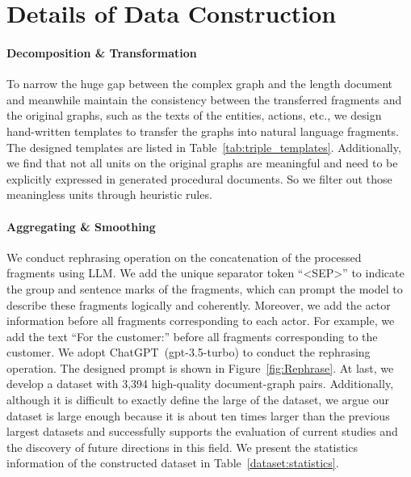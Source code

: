 \appendix


\section{Details of Data Construction
}

\label{app:DataConstruction}
%


\paragraph{Decomposition \& Transformation}

\label{app:DT}
To narrow the huge gap between the complex graph and the length document and meanwhile maintain the consistency between the transferred fragments and the original graphs, such as the texts of the entities, actions, etc., we design hand-written templates to transfer the graphs into natural language fragments. The designed templates are listed in Table~\ref{tab:triple_templates}.
Additionally, we find that not all units on the original graphs are meaningful and need to be explicitly expressed in generated procedural documents. So we filter out those meaningless units through heuristic rules.

\paragraph{Aggregating \& Smoothing}

\label{app:Aggregating_Smoothing}
%
We conduct rephrasing operation on the concatenation of the processed fragments using LLM. We add the unique separator token ``<SEP>'' to indicate the group and sentence marks of the fragments, which can prompt the model to describe these fragments logically and coherently.
Moreover, we add the actor information before all fragments corresponding to each actor. For example, we add the text ``For the customer:'' before all fragments corresponding to the customer.
We adopt ChatGPT~(gpt-3.5-turbo) to conduct the rephrasing operation. The designed prompt is shown in Figure~\ref{fig:Rephrase}.
At last, we develop a dataset with 3,394 high-quality document-graph pairs.
Additionally, although it is difficult to exactly define the large of the dataset, we argue our dataset is large enough because it is about ten times larger than the previous largest datasets and successfully supports the evaluation of current studies and the discovery of future directions in this field.
We present the statistics information of the constructed dataset in Table~\ref{dataset:statistics}.

